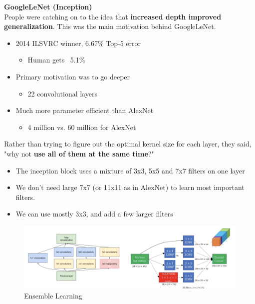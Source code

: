 \noindent\textbf{GoogleLeNet (Inception)}\\

People were catching on to the idea that \textbf{increased depth improved generalization}. This was the main motivation behind GoogleLeNet.

\begin{itemize}
    \item 2014 ILSVRC winner, 6.67\% Top-5 error
    \begin{itemize}
        \item Human gets ~5.1\%
    \end{itemize}
    \item Primary motivation was to go deeper
    \begin{itemize}
        \item 22 convolutional layers
    \end{itemize}
    \item Much more parameter efficient than AlexNet
    \begin{itemize}
        \item 4 million vs. 60 million for AlexNet
    \end{itemize}
\end{itemize}

Rather than trying to figure out the optimal kernel size for each layer, they said, "why not \textbf{use all of them at the same time}?"

\begin{itemize}
    \item The inception block uses a mixture of 3x3, 5x5 and 7x7 filters on one layer
    \item We don't need large 7x7 (or 11x11 as in AlexNet) to learn most important filters.
    \item We can use mostly 3x3, and add a few larger filters
\end{itemize}

\begin{figure}[h!t]
    \centering
    \includegraphics[width=0.75\linewidth]{inceptionblock.png}
    \caption{Ensemble Learning}
    \label{fig:enter-label}
\end{figure}

